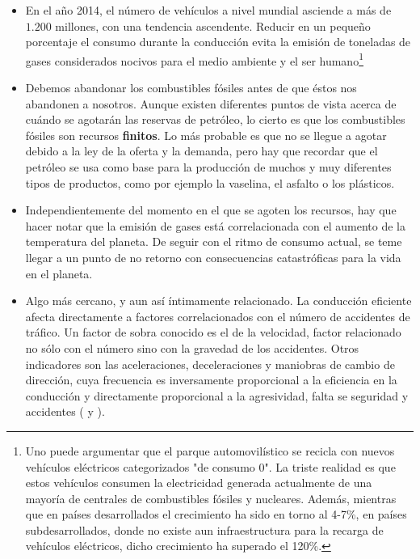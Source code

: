 \begin{itemize}
	\item En el año 2014, el número de vehículos a nivel mundial asciende a más de $1.200$ millones\cite{oica2014motrate}, con una tendencia ascendente. Reducir en un pequeño porcentaje el consumo durante la conducción evita la emisión de toneladas de gases considerados nocivos para el medio ambiente y el ser humano\footnote{Uno puede argumentar que el parque automovilístico se recicla con nuevos vehículos eléctricos categorizados "de consumo 0". La triste realidad es que estos vehículos consumen la electricidad generada actualmente de una mayoría de centrales de combustibles fósiles y nucleares. Además, mientras que en países desarrollados el crecimiento ha sido en torno al 4-7\%, en países subdesarrollados, donde no existe aun infraestructura para la recarga de vehículos eléctricos, dicho crecimiento ha superado el 120\%.}
	\item Debemos abandonar los combustibles fósiles antes de que éstos nos abandonen a nosotros. Aunque existen diferentes puntos de vista acerca de cuándo se agotarán las reservas de petróleo, lo cierto es que los combustibles fósiles son recursos \textbf{finitos}. Lo más probable es que no se llegue a agotar debido a la ley de la oferta y la demanda, pero hay que recordar que el petróleo se usa como base para la producción de muchos y muy diferentes tipos de productos, como por ejemplo la vaselina, el asfalto o los plásticos.
	\item Independientemente del momento en el que se agoten los recursos, hay que hacer notar que la emisión de gases está correlacionada con el aumento de la temperatura del planeta. De seguir con el ritmo de consumo actual, se teme llegar a un punto de no retorno con consecuencias catastróficas para la vida en el planeta.
	\item Algo más cercano, y aun así íntimamente relacionado. La conducción eficiente afecta directamente a factores correlacionados con el número de accidentes de tráfico. Un factor de sobra conocido es el de la velocidad, factor relacionado no sólo con el número sino con la gravedad de los accidentes\cite{imprialou2016re}. Otros indicadores son las aceleraciones, deceleraciones y maniobras de cambio de dirección, cuya frecuencia es inversamente proporcional a la eficiencia en la conducción y directamente proporcional a la agresividad, falta se seguridad y accidentes (\cite{dingus2006100} y \cite{lerner2010exploration}).
\end{itemize}

